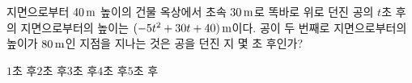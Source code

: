 지면으로부터 $40\mkern3mu \mathrm{m}$ 높이의 건물 옥상에서 초속 $30\mkern3mu \mathrm{m}$로 똑바로 위로 던진 공의 $t$초 후의 지면으로부터의 높이는 $(-5t^2+30t+40)\mkern3mu \mathrm{m}$이다. 공이 두 번째로 지면으로부터의 높이가 $80\mkern3mu \mathrm{m}$인 지점을 지나는 것은 공을 던진 지 몇 초 후인가?
\begin{choices32}{$1$초 후}{$2$초 후}{$3$초 후}{$4$초 후}{$5$초 후}\end{choices32}

